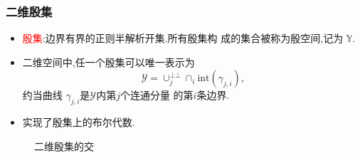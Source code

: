 \documentclass[UTF8]{ctexbeamer}	%
\theoremstyle{plain}
\theoremstyle{definition}
\theoremstyle{remark}
\numberwithin{equation}{section}
\begin{document}
\begin{frame}
    \frametitle{二维殷集}
    \begin{itemize}
        \item \textcolor{red}{殷集}:边界有界的正则半解析开集.所有殷集构
              成的集合被称为殷空间,记为 $\mathbb{Y}$.
        \item 二维空间中,任一个殷集可以唯一表示为
              \[\mathcal{Y} = \cup_j^{\bot \bot}\cap_i \text{int}(\gamma_{j, i} ),\]
              约当曲线 $\gamma_{j, i}$是$\mathcal{Y}$内第$j$个连通分量
              的第$i$条边界.
        \item 实现了殷集上的布尔代数.
    \end{itemize}
    \begin{figure}[!htb]
        \centering
        \caption{二维殷集的交}
    \end{figure}
\end{frame}
\end{document}

